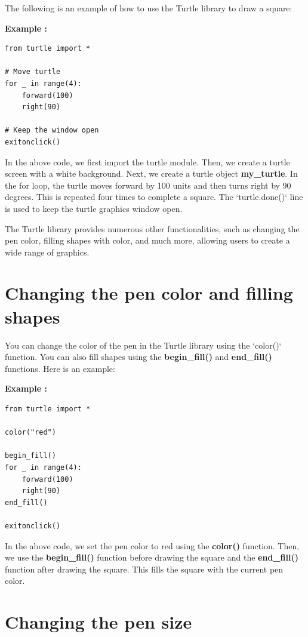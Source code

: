 \documentclass[12pt]{book}
\newtheorem{Example}{Example}[chapter]
\renewenvironment{Example}{\begin{trivlist}\item\relax
\textbf{Example \thesection: }}{\end{trivlist}}
\begin{document}
The following is an example of how to use the Turtle library to draw a square:

\begin{Example}
\begin{lstlisting}
from turtle import *

# Move turtle
for _ in range(4):
    forward(100)
    right(90)

# Keep the window open
exitonclick()
\end{lstlisting}
\end{Example}

In the above code, we first import the turtle module. Then, we create a turtle screen with a white background. Next, we create a turtle object \textbf{my\_turtle}. In the for loop, the turtle moves forward by 100 units and then turns right by 90 degrees. This is repeated four times to complete a square. The `turtle.done()` line is used to keep the turtle graphics window open.

The Turtle library provides numerous other functionalities, such as changing the pen color, filling shapes with color, and much more, allowing users to create a wide range of graphics.
\section{Changing the pen color and filling shapes}

You can change the color of the pen in the Turtle library using the `color()` function. You can also fill shapes using the \textbf{begin\_fill()} and \textbf{end\_fill()} functions. Here is an example:

\begin{Example}
\begin{lstlisting}
from turtle import *

color("red")

begin_fill()
for _ in range(4):
    forward(100)
    right(90)
end_fill()

exitonclick()
\end{lstlisting}
\end{Example}

In the above code, we set the pen color to red using the \textbf{color()} function. Then, we use the \textbf{begin\_fill()} function before drawing the square and the \textbf{end\_fill()} function after drawing the square. This fills the square with the current pen color. 

\section{Changing the pen size}
\end{document}
